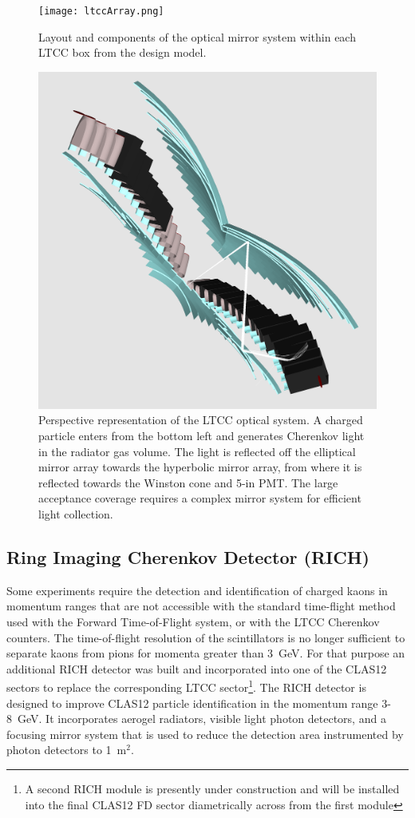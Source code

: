 \documentclass[final,3p]{elsarticle}
\begin{document}
\begin{twocolumn}
\begin{figure}[htbp!]
\centerline{\texttt{[image: ltccArray.png]}}
\caption{Layout and components of the optical mirror system within each LTCC box from the design model.}
\label{ltcc1}
\end{figure}
\begin{figure}[htbp!]
\centerline{\includegraphics[width=0.95\columnwidth]{ltcc-mod6.png}}
\caption{Perspective representation of the LTCC optical system. A charged particle enters from the bottom left
  and generates Cherenkov light in the radiator gas volume. The light is reflected off the elliptical mirror array
  towards the hyperbolic mirror array, from where it is reflected towards the Winston cone and 5-in PMT. The
  large acceptance coverage requires a complex mirror system for efficient light collection.}
\label{ltcc2}
\end{figure}

\subsection{Ring Imaging Cherenkov Detector (RICH)} 

Some experiments require the detection and identification of charged kaons in momentum ranges that are not 
accessible with the standard time-flight method used with the Forward Time-of-Flight system, or with the LTCC
Cherenkov counters. The time-of-flight resolution of the scintillators is no longer sufficient to separate kaons
from pions for momenta greater than 3~GeV. For that purpose an additional RICH detector was built and incorporated
into one of the CLAS12 sectors to replace the corresponding LTCC sector\footnote{A second RICH module is presently
  under construction and will be installed into the final CLAS12 FD sector diametrically across from the first module}. The
RICH detector is designed to improve CLAS12 particle identification in the momentum range 3-8~GeV. It incorporates
aerogel radiators, visible light photon detectors, and a focusing mirror system that is used to reduce the detection area
instrumented by photon detectors to 1~m$^2$.


\end{twocolumn}
\end{document}
